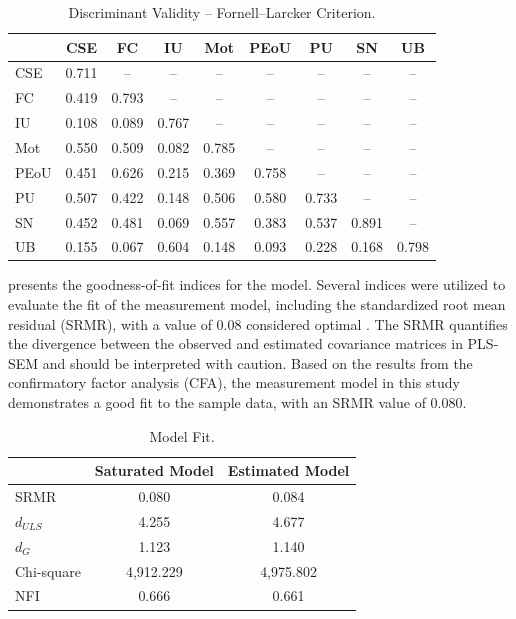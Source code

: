 \documentclass[english]{textolivre}
\begin{document}
\begin{table}[htbp]
\centering
\begin{threeparttable}
\caption{Discriminant Validity -- Fornell--Larcker Criterion.}
\label{tab6}
\begin{tabular}{lcccccccc}
\toprule
 & CSE & FC & IU & Mot & PEoU & PU & SN & UB \\
\midrule
CSE  & 0.711 & --    & --    & --    & --    & --    & --    & --    \\
FC   & 0.419 & 0.793 & --    & --    & --    & --    & --    & --    \\
IU   & 0.108 & 0.089 & 0.767 & --    & --    & --    & --    & --    \\
Mot  & 0.550 & 0.509 & 0.082 & 0.785 & --    & --    & --    & --    \\
PEoU & 0.451 & 0.626 & 0.215 & 0.369 & 0.758 & --    & --    & --    \\
PU   & 0.507 & 0.422 & 0.148 & 0.506 & 0.580 & 0.733 & --    & --    \\
SN   & 0.452 & 0.481 & 0.069 & 0.557 & 0.383 & 0.537 & 0.891 & --    \\
UB   & 0.155 & 0.067 & 0.604 & 0.148 & 0.093 & 0.228 & 0.168 & 0.798 \\
\bottomrule
\end{tabular}
\end{threeparttable}
\end{table}

 presents the goodness-of-fit indices for the model. Several indices were utilized to evaluate the fit of the measurement model, including the standardized root mean residual (SRMR), with a value of 0.08 considered optimal \cite{HuBentler1999FitIndexes}. The SRMR quantifies the divergence between the observed and estimated covariance matrices in PLS-SEM and should be interpreted with caution. Based on the results from the confirmatory factor analysis (CFA), the measurement model in this study demonstrates a good fit to the sample data, with an SRMR value of 0.080.

\begin{table}[htbp]
\centering
\begin{threeparttable}
\caption{Model Fit.}
\label{tab7}
\begin{tabular}{lcc}
\toprule
 & Saturated Model & Estimated Model \\
\midrule
SRMR        & 0.080     & 0.084 \\
$d_{ULS}$   & 4.255     & 4.677 \\
$d_G$       & 1.123     & 1.140 \\
Chi-square  & 4,912.229 & 4,975.802 \\
NFI         & 0.666     & 0.661 \\
\bottomrule
\end{tabular}
\end{threeparttable}
\end{table}
\end{document}
